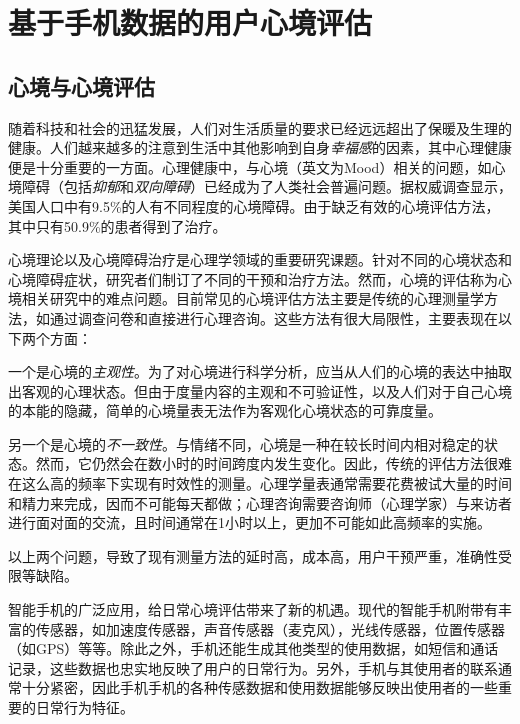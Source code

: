 

\chapter{基于手机数据的用户心境评估}
\label{cha:mood}

\section{心境与心境评估}

随着科技和社会的迅猛发展，人们对生活质量的要求已经远远超出了保暖及生理的健康。人们越来越多的注意到生活中其他影响到自身\textit{幸福感}的因素，其中心理健康便是十分重要的一方面。心理健康中，与心境（英文为Mood）相关的问题，如心境障碍（包括\textit{抑郁}和\textit{双向障碍}）已经成为了人类社会普遍问题。据权威调查显示，美国人口中有9.5\%的人有不同程度的心境障碍。由于缺乏有效的心境评估方法，其中只有50.9\%的患者得到了治疗\cite{disorder}。

心境理论以及心境障碍治疗是心理学领域的重要研究课题。针对不同的心境状态和心境障碍症状，研究者们制订了不同的干预和治疗方法。然而，心境的评估称为心境相关研究中的难点问题。目前常见的心境评估方法主要是传统的心理测量学方法，如通过调查问卷和直接进行心理咨询。这些方法有很大局限性，主要表现在以下两个方面：

一个是心境的\textit{主观性}。为了对心境进行科学分析，应当从人们的心境的表达中抽取出客观的心理状态。但由于度量内容的主观和不可验证性，以及人们对于自己心境的本能的隐藏，简单的心境量表无法作为客观化心境状态的可靠度量。

另一个是心境的\textit{不一致性}。与情绪不同，心境是一种在较长时间内相对稳定的状态。然而，它仍然会在数小时的时间跨度内发生变化。因此，传统的评估方法很难在这么高的频率下实现有时效性的测量。心理学量表通常需要花费被试大量的时间和精力来完成，因而不可能每天都做；心理咨询需要咨询师（心理学家）与来访者进行面对面的交流，且时间通常在1小时以上，更加不可能如此高频率的实施。

以上两个问题，导致了现有测量方法的延时高，成本高，用户干预严重，准确性受限等缺陷。

智能手机的广泛应用，给日常心境评估带来了新的机遇。现代的智能手机附带有丰富的传感器，如加速度传感器，声音传感器（麦克风），光线传感器，位置传感器（如GPS）等等。除此之外，手机还能生成其他类型的使用数据，如短信和通话记录，这些数据也忠实地反映了用户的日常行为。另外，手机与其使用者的联系通常十分紧密，因此手机手机的各种传感数据和使用数据能够反映出使用者的一些重要的日常行为特征\cite{20122515131481}。



